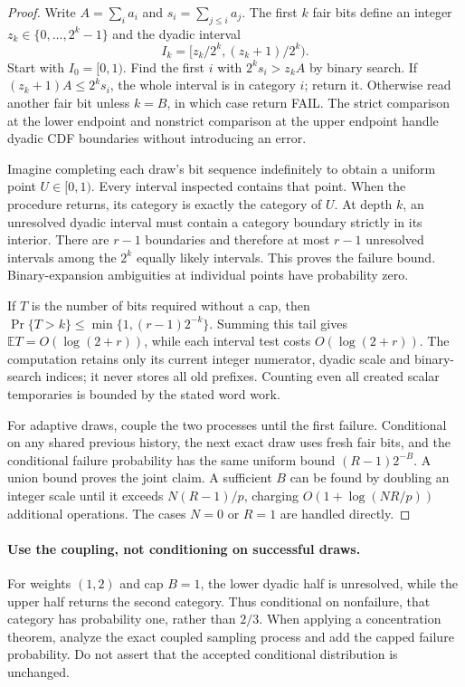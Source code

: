 \begin{proof}
Write $A=\sum_i a_i$ and $s_i=\sum_{j\leq i}a_j$. The first $k$
fair bits define an integer $z_k\in\{0,\ldots,2^k-1\}$ and the
dyadic interval
\[
 I_k=[z_k/2^k,(z_k+1)/2^k).
\]
Start with $I_0=[0,1)$. Find the first $i$ with
$2^k s_i>z_k A$ by binary search. If
$(z_k+1)A\leq2^k s_i$, the whole interval is in category $i$;
return it. Otherwise read another fair bit unless $k=B$, in which
case return \textnormal{FAIL}. The strict comparison at the lower
endpoint and nonstrict comparison at the upper endpoint handle dyadic
CDF boundaries without introducing an error.

Imagine completing each draw's bit sequence indefinitely to obtain a
uniform point $U\in[0,1)$. Every interval inspected contains that point.
When the procedure returns, its category is exactly the category of $U$.
At depth $k$, an unresolved dyadic interval must contain a category
boundary strictly in its interior. There are $r-1$ boundaries and
therefore at most $r-1$ unresolved intervals among the $2^k$ equally
likely intervals. This proves the failure bound. Binary-expansion
ambiguities at individual points have probability zero.

If $T$ is the number of bits required without a cap, then
$\Pr\{T>k\}\leq\min\{1,(r-1)2^{-k}\}$. Summing this tail gives
$\mathbb E T=O(\log(2+r))$, while each interval test costs
$O(\log(2+r))$. The computation retains only its current integer
numerator, dyadic scale and binary-search indices; it never stores all
old prefixes. Counting even all created scalar temporaries is bounded
by the stated word work.

For adaptive draws, couple the two processes until the first failure.
Conditional on any shared previous history, the next exact draw uses
fresh fair bits, and the conditional failure probability has the same
uniform bound $(R-1)2^{-B}$. A union bound proves the joint claim.
A sufficient $B$ can be found by doubling an integer scale until it
exceeds $N(R-1)/p$, charging $O(1+\log(NR/p))$ additional operations.
The cases $N=0$ or $R=1$ are handled directly.
\end{proof}

\paragraph{Use the coupling, not conditioning on successful draws.}
For weights $(1,2)$ and cap $B=1$, the lower dyadic half is unresolved,
while the upper half returns the second category. Thus conditional on
nonfailure, that category has probability one, rather than $2/3$.
When applying a concentration theorem, analyze the exact coupled
sampling process and add the capped failure probability. Do not assert
that the accepted conditional distribution is unchanged.

